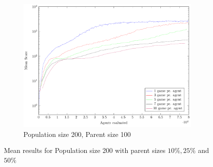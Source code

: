 \begin{figure}
\begin{subfigure}[b]{0.49\textwidth}
    	\caption{Population size 200, Parent size 100}
        \includegraphics[width=\textwidth]{data/ce_population_offspring/200x_split/constant_l200_o100/mean/PlotFile.pdf}
    \end{subfigure}
    
    \caption{Mean results for Population size 200 with parent sizes $10 \% , 25 \%$ and $50 \%$}
\end{figure}

\clearpage

